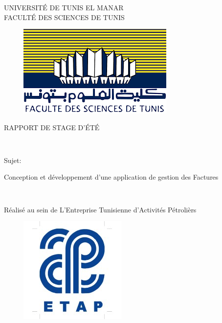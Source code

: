 \documentclass[12pt]{report}
\renewcommand{\thepage}{}
\begin{document}
\renewcommand{\thepage}{\arabic{page}}
\setcounter{page}{1}
\thispagestyle{empty}
\begin{center}
UNIVERSITÉ DE TUNIS EL MANAR\\[15pt]
FACULTÉ DES SCIENCES DE TUNIS

\vspace{20PT}
\begin{figure}[H]
  \centering
  \includegraphics[scale=0.5]{fst}
\end{figure}
\vspace{20PT}
\begin{huge}
RAPPORT DE STAGE D'ÉTÉ
\end{huge}
\\
\vspace{30pt}
\begin{Large}
Sujet:\\
\end{Large}

\vspace{30pt}
\begin{Huge}
Conception et développement d'une application de gestion des Factures 
\end{Huge}
\\
\vspace{50pt}
\begin{Large}
Réalisé au sein de L'Entreprise Tunisienne d'Activités Pétrolièrs
\end{Large}
\end{center}
\begin{figure}[H]
  \centering
  \includegraphics[scale=0.5]{etap}
  \label{fig:votre-label}
\end{figure}
\end{document}

